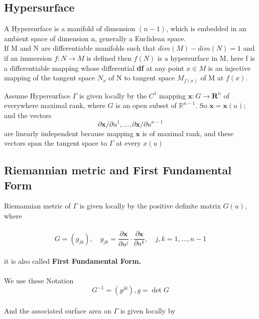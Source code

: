 \documentclass[oneside]{book}
\begin{document}
\subsection{Hypersurface}




A Hypersurface is a manifold of dimension $(n-1)$, which is embedded in an ambient space of dimension n, generally a Euclidean space.
\\
    If M and N are differentiable manifolds such that $dim(M)-dim(N) = 1$ and if an immersion $f:N\rightarrow M$ is defined then $f(N)$ is a hypersurface in M, here f is a differentiable mapping whose differential \textbf{df} at any point  $x\in M$ is an injective mapping of the 
     tangent space $N_{x}$ of N to  tangent space $M_{f(x)}$ of M at $f(x)$.
    

    
    
       Assume  Hypersurface $\Gamma$ is given locally by the $C^{1}$ mapping $\mathbf{x}: G \rightarrow \mathbf{R}^{n}$ of everywhere
maximal rank, where $G$ is an open subset of $\mathbb{R}^{n-1} .$ So $\mathbf{x}=\mathbf{x}(u)$; and the vectors \\
$$
\partial \mathbf{x} / \partial u^{1}, \ldots, \partial \mathbf{x} / \partial u^{n-1} 
$$
are linearly independent because  mapping $\mathbf{x}$ is of maximal rank, and these vectors span the tangent space to $\Gamma$ at every $x(u)$\\







   


\subsection{Riemannian metric and First Fundamental Form}
{Riemannian metric} of $\Gamma$ is given
locally by the positive definite matrix $G(u),$ where 
\\\\
  \begin{equation}
 G=\left(g_{j k}\right), \quad g_{j k}=\frac{\partial \mathbf{x}}{\partial u^{j}} \cdot \frac{\partial \mathbf{x}}{\partial u^{k}}, \quad j, k=1, \ldots, n-1     \end{equation}
\\
it is also called \textbf{First Fundamental Form.} \\\\
   We use these Notation \\
   \[ G^{-1}=\left(g^{j k}\right),   g=\operatorname{det}{G} \] \\
    And the associated surface area on  
   $\Gamma$ is given locally by \\
\end{document}
